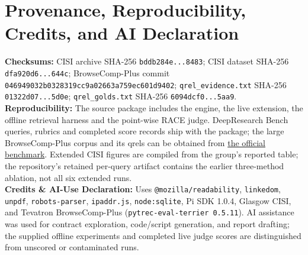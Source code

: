 \documentclass[conference]{IEEEtran}
\begin{document}
\section{Provenance, Reproducibility, Credits, and AI Declaration}
\begingroup
\small
\raggedright
\textbf{Checksums:} CISI archive SHA-256 \texttt{bddb284e...8483}; CISI dataset SHA-256 \texttt{dfa920d6...644c}; BrowseComp-Plus commit \texttt{046949032b0328319cc9a02663a759ec601d9402}; \texttt{qrel\_evidence.txt} SHA-256 \texttt{01322d07...5d0e}; \texttt{qrel\_golds.txt} SHA-256 \texttt{6094dcf0...5aa9}.\\
\textbf{Reproducibility:} The source package includes the engine, the live extension, the offline retrieval harness and the point-wise RACE judge. DeepResearch Bench queries, rubrics and completed score records ship with the package; the large BrowseComp-Plus corpus and its qrels can be obtained from \href{https://github.com/texttron/BrowseComp-Plus}{the official benchmark}. Extended CISI figures are compiled from the group's reported table; the repository's retained per-query artifact contains the earlier three-method ablation, not all six extended runs.\\
\textbf{Credits \& AI-Use Declaration:} Uses \texttt{@mozilla/readability}, \texttt{linkedom}, \texttt{unpdf}, \texttt{robots-parser}, \texttt{ipaddr.js}, \texttt{node:sqlite}, Pi SDK 1.0.4, Glasgow CISI, and Tevatron BrowseComp-Plus (\texttt{pytrec-eval-terrier 0.5.11}). AI assistance was used for contract exploration, code/script generation, and report drafting; the supplied offline experiments and completed live judge scores are distinguished from unscored or contaminated runs.
\par
\endgroup
\end{document}
